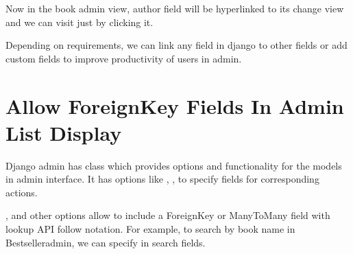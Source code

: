 \documentclass[a5paper,10pt,english]{sphinxmanual}
\begin{document}
Now in the book admin view, author field will be hyperlinked to its change view and we can visit just by clicking it.

Depending on requirements, we can link any field in django to other fields or add custom fields to improve productivity of users in admin.


\chapter{Allow ForeignKey Fields In Admin List Display}
\label{\detokenize{admin_list_display_foreignkey:allow-foreignkey-fields-in-admin-list-display}}\label{\detokenize{admin_list_display_foreignkey::doc}}
Django admin has  class which provides options and functionality for the models in admin interface. It has options like , ,  to specify fields for corresponding actions.

,  and other options allow to include a ForeignKey or ManyToMany field with lookup API follow notation. For example, to search by book name in Bestselleradmin, we can specify  in search fields.

\begin{sphinxVerbatim}[commandchars=\\\{\}]
   

   


 
       
         


 
\end{sphinxVerbatim}
\end{document}
